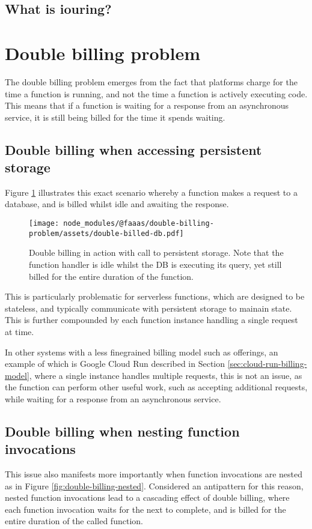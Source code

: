 \subsection{What is iouring?}

\section{Double billing problem}
\label{sec:double-billing-problem}

The double billing problem emerges from the fact that \faas{} platforms charge for the time a function is running, and not the time a function is actively executing code. This means that if a function is waiting for a response from an asynchronous service, it is still being billed for the time it spends waiting.

\subsection{Double billing when accessing persistent storage}
Figure \ref{fig:double-billing-db} illustrates this exact scenario whereby a function makes a request to a database, and is billed whilst idle and awaiting the response.

\begin{figure}[t]
    \texttt{[image: node\_modules/@faaas/double-billing-problem/assets/double-billed-db.pdf]}
    \caption{Double billing in action with call to persistent storage. Note that the function handler is idle whilst the DB is executing its query, yet still billed for the entire duration of the function.}
    \label{fig:double-billing-db}
\end{figure}

This is particularly problematic for serverless functions, which are designed to be stateless, and typically communicate with persistent storage to mainain state. This is further compounded by each function instance handling a single request at time.

In other systems with a less finegrained billing model such as \caas{} offerings, an example of which is Google Cloud Run described in Section \ref{sec:cloud-run-billing-model}, where a single instance handles multiple requests, this is not an issue, as the function can perform other useful work, such as accepting additional requests, while waiting for a response from an asynchronous service.

\subsection{Double billing when nesting function invocations}
This issue also manifests more importantly when function invocations are nested as in Figure \ref{fig:double-billing-nested}. Considered an antipattern for this reason\cite{LambdaFunctionsCalling}, nested function invocations lead to a cascading effect of double billing, where each function invocation waits for the next to complete, and is billed for the entire duration of the called function.

